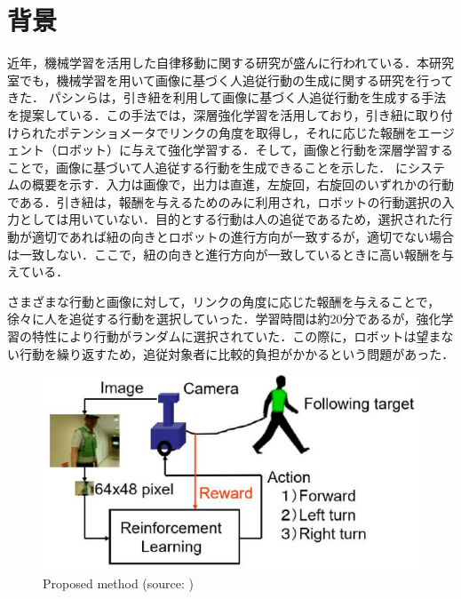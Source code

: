 
\section{背景}
  近年，機械学習を活用した自律移動に関する研究が盛んに行われている．本研究室でも，機械学習を用いて画像に基づく人追従行動の生成に関する研究を行ってきた．
  パシンら\cite{pasin1}\cite{pasin2}\cite{pasin3}は，引き紐を利用して画像に基づく人追従行動を生成する手法を提案している．この手法では，深層強化学習\cite{hado}を活用しており，引き紐に取り付けられたポテンショメータでリンクの角度を取得し，それに応じた報酬をエージェント（ロボット）に与えて強化学習\cite{leslie}する．そして，画像と行動を深層学習\cite{yann2}することで，画像に基づいて人追従する行動を生成できることを示した．
  にシステムの概要を示す．入力は画像で，出力は直進，左旋回，右旋回のいずれかの行動である．引き紐は，報酬を与えるためのみに利用され，ロボットの行動選択の入力としては用いていない．目的とする行動は人の追従であるため，選択された行動が適切であれば紐の向きとロボットの進行方向が一致するが，適切でない場合は一致しない．ここで，紐の向きと進行方向が一致しているときに高い報酬を与えている．

  さまざまな行動と画像に対して，リンクの角度に応じた報酬を与えることで，徐々に人を追従する行動を選択していった．学習時間は約20分であるが，強化学習の特性により行動がランダムに選択されていた．この際に，ロボットは望まない行動を繰り返すため，追従対象者に比較的負担がかかるという問題があった．

\newpage

  \begin{figure}[h]
    \centering
    \includegraphics[keepaspectratio, scale=1.25] {images/pdf/pasin_system}
    \caption[Proposed method]{Proposed method (source: \cite{pasin1})}
    \label{Fig:pasin_system}
  \end{figure}


